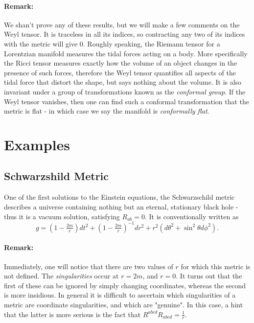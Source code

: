 \documentclass[11pt,fleqn]{report}
\begin{document}
\paragraph{Remark:} We shan't prove any of these results, but we will make a few comments on the Weyl tensor. It is traceless in all its indices, so contracting any two of its indices with the metric will give $0$. Roughly speaking, the Riemann tensor for a Lorentzian manifold measures the tidal forces acting on a body. More specifically the Ricci tensor measures exactly how the volume of an object changes in the presence of such forces, therefore the Weyl tensor quantifies all aspects of the tidal force that distort the shape, but says nothing about the volume. It is also invariant under a group of transformations known as the \textit{conformal group}. If the Weyl tensor vanishes, then one can find such a conformal transformation that the metric is flat - in which case we say the manifold is \textit{conformally flat}.

\section{Examples}


\subsection{Schwarzshild Metric}

\paragraph{} One of the first solutions to the Einstein equations, the Schwarzschild metric describes a universe containing nothing but an eternal, stationary black hole - thus it is a vacuum solution, satisfying $R_{ab} = 0$. It is conventionally written as
	\begin{equation}
		g = \left( 1 - \tfrac{2m}{r} \right)dt^2 + \left( 1 - \tfrac{2m}{r} \right)^{-1} dr^2 + r^2 \left( d\theta^2 + \sin^2\theta d\phi^2 \right).
	\end{equation}
	
\paragraph{Remark:} Immediately, one will notice that there are two values of $r$ for which this metric is not defined. The \textit{singularities} occur at $r = 2m$, and $r = 0$. It turns out that the first of these can be ignored by simply changing coordinates, whereas the second is more insidious. In general it is difficult to ascertain which singularities of a metric are coordinate singularities, and which are "genuine". In this case, a hint that the latter is more serious is the fact that $R^{abcd}R_{abcd} = \tfrac{1}{r}$.
\end{document}
